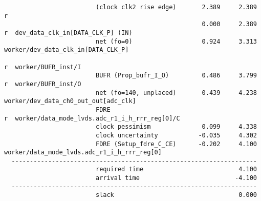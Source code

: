 \documentclass{article}
\begin{document}
\begin{lstlisting}
                         (clock clk2 rise edge)       2.389     2.389 r
                                                      0.000     2.389 r  dev_data_clk_in[DATA_CLK_P] (IN)
                         net (fo=0)                   0.924     3.313    worker/dev_data_clk_in[DATA_CLK_P]
                                                                      r  worker/BUFR_inst/I
                         BUFR (Prop_bufr_I_O)         0.486     3.799 r  worker/BUFR_inst/O
                         net (fo=140, unplaced)       0.439     4.238    worker/dev_data_ch0_out_out[adc_clk]
                         FDRE                                         r  worker/data_mode_lvds.adc_r1_i_h_rrr_reg[0]/C
                         clock pessimism              0.099     4.338
                         clock uncertainty           -0.035     4.302
                         FDRE (Setup_fdre_C_CE)      -0.202     4.100    worker/data_mode_lvds.adc_r1_i_h_rrr_reg[0]
  -------------------------------------------------------------------
                         required time                          4.100
                         arrival time                          -4.100
  -------------------------------------------------------------------
                         slack                                  0.000




\end{lstlisting}
\end{document}
